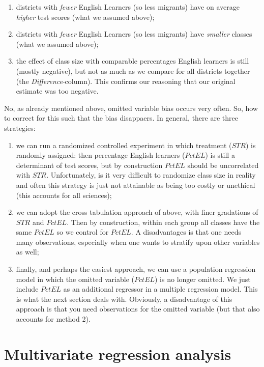 \documentclass[
]{book}
\providecommand{\tightlist}{%
  \setlength{\itemsep}{0pt}\setlength{\parskip}{0pt}}
\begin{document}
\begin{enumerate}
\def\labelenumi{\arabic{enumi})}
\tightlist
\item
  districts with \emph{fewer} English Learners (so less migrants) have on average \emph{higher} test scores (what we assumed above);
\item
  districts with \emph{fewer} English Learners (so less migrants) have \emph{smaller} classes (what we assumed above);
\item
  the effect of class size with comparable percentages English learners is still (mostly negative), but not as much as we compare for all districts together (the \emph{Difference}-column). This confirms our reasoning that our original estimate was too negative.
\end{enumerate}

No, as already mentioned above, omitted variable bias occurs very often. So, how to correct for this such that the bias disappaers. In general, there are three strategies:

\begin{enumerate}
\def\labelenumi{\arabic{enumi}.}
\tightlist
\item
  we can run a randomized controlled experiment in which treatment (\(STR\)) is randomly assigned: then percentage English learners (\(PctEL\)) is still a determinant of test scores, but by construction \(PctEL\) should be uncorrelated with \(STR\). Unfortunately, is it very difficult to randomize class size in reality and often this strategy is just not attainable as being too costly or unethical (this accounts for all sciences);
\item
  we can adopt the cross tabulation approach of above, with finer gradations of \(STR\) and \(PctEL\). Then by construction, within each group all classes have the same \(PctEL\) so we control for \(PctEL\). A disadvantages is that one needs many observations, especially when one wants to stratify upon other variables as well;
\item
  finally, and perhaps the easiest approach, we can use a population regression model in which the omitted variable (\(PctEL\)) is no longer omitted. We just include \(PctEL\) as an additional regressor in a multiple regression model. This is what the next section deals with. Obviously, a disadvantage of this approach is that you need observations for the omitted variable (but that also accounts for method 2).
\end{enumerate}

\hypertarget{sec:multivariate}{%
\section{Multivariate regression analysis}\label{sec:multivariate}}
\end{document}

